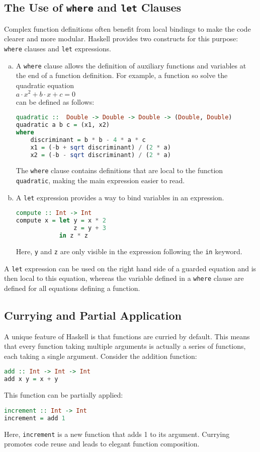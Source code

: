 \subsection{The Use of \texttt{where} and \texttt{let} Clauses}
Complex function definitions often benefit from local bindings to make the code clearer and more
modular. Haskell provides two constructs for this purpose: \texttt{where} clauses and \texttt{let} expressions.
\begin{enumerate}[(a)]
\item A \texttt{where} clause allows the definition of auxiliary functions and variables at the end of a function
  definition. For example, a function so solve the quadratic equation
  \\[0.2cm]
  \hspace*{1.3cm}
  $a \cdot x^2 + b \cdot x + c = 0$
  \\[0.2cm]
  can be defined as follows:
  \begin{lstlisting}[style=haskellstyle, language=Haskell]
quadratic ::  Double -> Double -> Double -> (Double, Double)
quadratic a b c = (x1, x2)
where
    discriminant = b * b - 4 * a * c
    x1 = (-b + sqrt discriminant) / (2 * a)
    x2 = (-b - sqrt discriminant) / (2 * a)
\end{lstlisting}
The \texttt{where} clause contains definitions that are local to the function \texttt{quadratic}, making the
main expression easier to read. 
\item A \texttt{let} expression provides a way to bind variables in an expression.
\begin{lstlisting}[style=haskellstyle, language=Haskell]
compute :: Int -> Int
compute x = let y = x * 2
                z = y + 3
            in z * z
\end{lstlisting}
Here, \texttt{y} and \texttt{z} are only visible in the expression following the \texttt{in} keyword.
\end{enumerate}
  A \texttt{let} expression can be used on the right hand side of a guarded equation and is then
  local to this equation, whereas the variable defined in a \texttt{where} clause are defined for all equations
  defining a function.

\subsection{Currying and Partial Application}
A unique feature of Haskell is that functions are curried by default. This means that every function taking multiple arguments is actually a series of functions, each taking a single argument. Consider the addition function:
\begin{lstlisting}[style=haskellstyle, language=Haskell]
add :: Int -> Int -> Int
add x y = x + y
\end{lstlisting}
This function can be partially applied:
\begin{lstlisting}[style=haskellstyle, language=Haskell]
increment :: Int -> Int
increment = add 1
\end{lstlisting}
Here, \texttt{increment} is a new function that adds 1 to its argument. Currying promotes code reuse and leads to elegant function composition.

